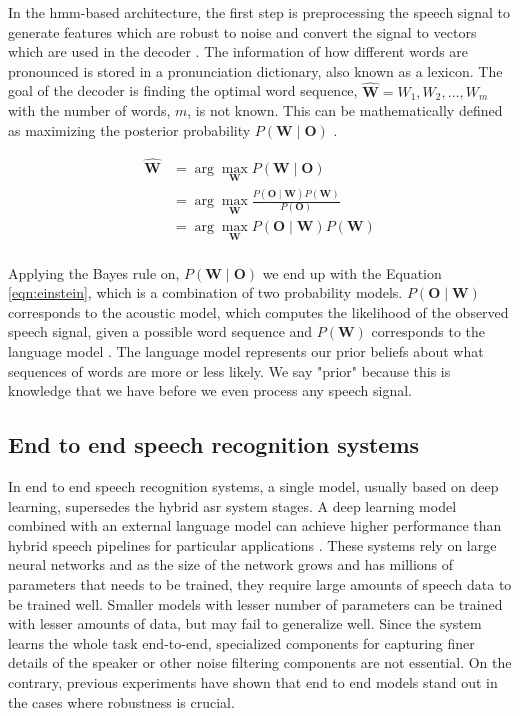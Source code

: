 In the \acrshort{hmm}-based architecture, the first step is preprocessing the speech signal to generate features which are robust to noise and convert the signal to vectors which are used in the decoder \cite{Mukhedkar2014RobustEnvironments}. The information of how different words are pronounced is stored in a pronunciation dictionary, also known as a lexicon. The goal of the decoder is finding the optimal word sequence, $\hat{\boldsymbol{W}}=W_{1}, W_{2}, \ldots, W_{m}$ with the number of words, $m$, is not known. This can be mathematically defined as maximizing the posterior probability $P(\boldsymbol{W} \mid \boldsymbol{O})$  \cite{Mansikkaniemi2010AcousticService}.

\begin{equation}
\begin{aligned}
\label{eqn:einstein} 
\hat{\boldsymbol{W}} &=\arg \max _{\boldsymbol{W}} P(\boldsymbol{W} \mid \boldsymbol{O}) \\
 &=\arg \max _{\boldsymbol{W}} \frac{P(\boldsymbol{O} \mid \boldsymbol{W}) P(\boldsymbol{W})}{P(\boldsymbol{O})} \\
 &=\arg \max _{\boldsymbol{W}} P(\boldsymbol{O} \mid \boldsymbol{W}) P(\boldsymbol{W}) 
\\ 
\end{aligned}
\end{equation}

Applying the Bayes rule on, $P(\boldsymbol{W} \mid \boldsymbol{O})$ we end up with the Equation \ref{eqn:einstein}, which is a combination of two probability models. $P(\boldsymbol{O} \mid \boldsymbol{W})$ corresponds to the acoustic model,  which computes the likelihood of the observed speech signal, given a possible word sequence and $P(\boldsymbol{W})$ corresponds to the language model \cite{Ney1999DynamicRecognition}. The language model represents our prior beliefs about what sequences of words are more or less likely. We say "prior" because this is knowledge that we have before we even process any speech signal. 


\subsection{End to end speech recognition systems}
\label{section:e2easr}
In end to end speech recognition systems, a single model, usually based on deep learning, supersedes the hybrid \acrshort{asr} system stages. A deep learning model combined with an external language model can achieve higher performance than hybrid speech pipelines for particular applications \cite{Deshmukh2020ComparisonRecognition}. These systems rely on large neural networks and as the size of the network grows and has millions of parameters that needs to be trained, they require large amounts of speech data to be trained well. Smaller models with lesser number of parameters can be trained with lesser amounts of data, but may fail to generalize well\cite{Tanaka2021End-to-EndLearning}. Since the system learns the whole task end-to-end, specialized components for capturing finer details of the speaker or other noise filtering components are not essential. On the contrary, previous experiments have shown that end to end models stand out in the cases where robustness is crucial\cite{Hannun2014DeepRecognition}. 

